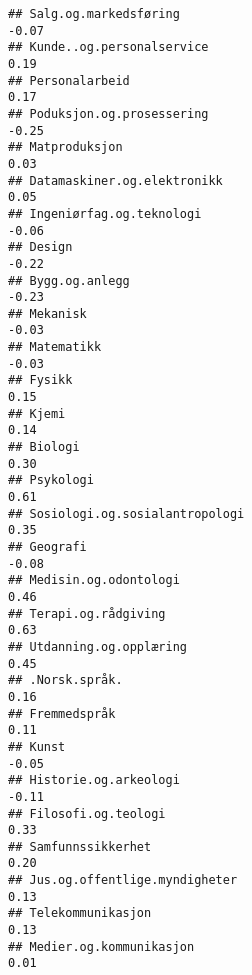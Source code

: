 \documentclass[
]{article}
\begin{document}
\begin{verbatim}
## Salg.og.markedsføring                                                            -0.07
## Kunde..og.personalservice                                                         0.19
## Personalarbeid                                                                    0.17
## Poduksjon.og.prosessering                                                        -0.25
## Matproduksjon                                                                     0.03
## Datamaskiner.og.elektronikk                                                       0.05
## Ingeniørfag.og.teknologi                                                         -0.06
## Design                                                                           -0.22
## Bygg.og.anlegg                                                                   -0.23
## Mekanisk                                                                         -0.03
## Matematikk                                                                       -0.03
## Fysikk                                                                            0.15
## Kjemi                                                                             0.14
## Biologi                                                                           0.30
## Psykologi                                                                         0.61
## Sosiologi.og.sosialantropologi                                                    0.35
## Geografi                                                                         -0.08
## Medisin.og.odontologi                                                             0.46
## Terapi.og.rådgiving                                                               0.63
## Utdanning.og.opplæring                                                            0.45
## .Norsk.språk.                                                                     0.16
## Fremmedspråk                                                                      0.11
## Kunst                                                                            -0.05
## Historie.og.arkeologi                                                            -0.11
## Filosofi.og.teologi                                                               0.33
## Samfunnssikkerhet                                                                 0.20
## Jus.og.offentlige.myndigheter                                                     0.13
## Telekommunikasjon                                                                 0.13
## Medier.og.kommunikasjon                                                           0.01

\end{verbatim}
\end{document}
